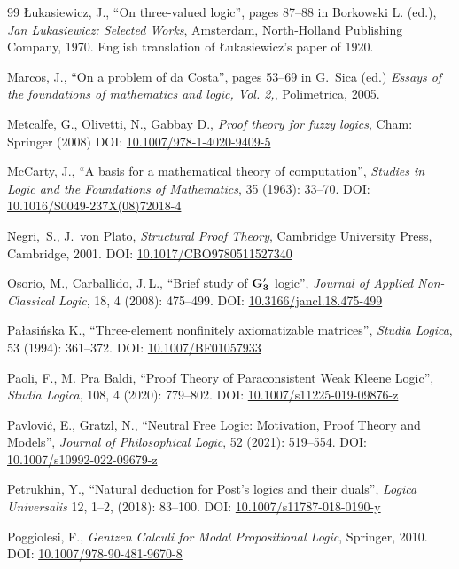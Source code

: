\documentclass[11pt,a4paper,titlepage]{article}
\theoremstyle{definition}
\newcommand{\3}{\vspace{.3in}}
\newcommand{\2}{\vspace{.2in}}
\newcommand{\1}{\vspace{.1in}}
\newcommand{\5}{\vspace{.05in}}
\newcommand\DOI[2]{DOI: \href{#1#2}{#2}}
\newcommand{\ts}{\,}
\begin{document}
\begin{thebibliography}{99}
\L ukasiewicz, J., ``On three-valued logic'', pages 87--88 in Bor\-kowski L. (ed.), \textit{Jan \L ukasiewicz: Selected Works}, Amsterdam, North-Holland Publishing Company, 1970. English translation of \L ukasiewicz's paper of 1920.

Marcos, J.,  
``On a problem of da Costa'', pages 53--69 in G.~Sica (ed.) \textit{Essays of the foundations of mathematics and logic, Vol. 2,},  Polimetrica, 2005.

 Metcalfe, G., Olivetti, N., Gabbay D., \textit{Proof theory for fuzzy logics}, Cham: Springer (2008) 
\DOI{http://dx.doi.org/}{10.1007/978-1-4020-9409-5}

McCarty, J., ``A basis for a mathematical theory of computation'', \textit{Studies in Logic and the Foundations of Mathematics}, 35 (1963): 33--70.
\DOI{http://dx.doi.org/}{10.1016/S0049-237X(08)72018-4}

Negri,~S., J.~von Plato, \textit{Structural Proof Theory}, Cambridge University Press, Cambridge, 2001.
\DOI{http://dx.doi.org/}{10.1017/CBO9780511527340}


Osorio, M., Carballido, J.\ts L., ``Brief study of $\bf G_3^\prime $ logic'', \textit{Journal of Applied
Non-Classical Logic}, 18, 4 (2008): 475--499.
\DOI{http://dx.doi.org/}{10.3166/jancl.18.475-499}

Pa\l{}asi\'{n}ska K.,  ``Three-element nonfinitely axiomatizable matrices'', \textit{Studia Logica}, 53 (1994): 361--372.
\DOI{http://dx.doi.org/}{10.1007/BF01057933}

Paoli, F., M. Pra Baldi,  ``Proof Theory of Paraconsistent Weak Kleene Logic'', \textit{Studia Logica}, 108, 4 (2020): 779--802.
\DOI{http://dx.doi.org/}{10.1007/s11225-019-09876-z}

Pavlovi\'{c}, E., Gratzl, N., ``Neutral Free Logic: Motivation, Proof Theory and Models'', \textit{Journal of Philosophical Logic}, 52 (2021): 519--554. \DOI{http://dx.doi.org/}{10.1007/s10992-022-09679-z}

Petrukhin, Y., ``Natural deduction for Post's logics and their duals'', \textit{Logica Universalis} 12, 1--2, (2018): 83--100.
\DOI{http://dx.doi.org/}{10.1007/s11787-018-0190-y}

Poggiolesi, F., \textit{Gentzen Calculi for Modal Propositional Logic}, Springer, 2010. 
\DOI{http://dx.doi.org/}{10.1007/978-90-481-9670-8}


\end{thebibliography}
\end{document}
